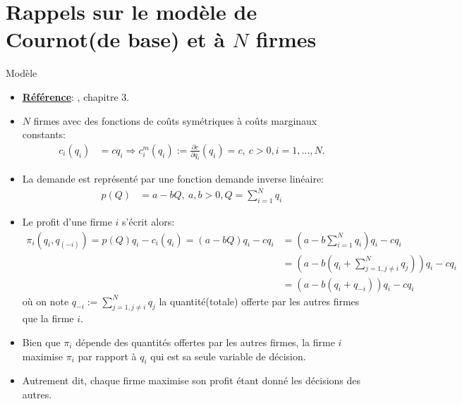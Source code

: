 \begin{frame}
\titlepage
\end{frame}
\begin{frame}
 \tableofcontents
    \end{frame}



\section{Rappels sur le modèle de Cournot(de base) et à $N$ firmes}
\frame{\sectionpage}
\begin{frame}[allowframebreaks]{Modèle}
\begin{itemize}
\item \textbf{\underline{Référence}}: \cite{belleflamme_peitz_2015}, chapitre 3.
\item $N$ firmes avec des fonctions de coûts symétriques à coûts marginaux constants:
\begin{align*}
    c_i(q_i) &=cq_i \Rightarrow c^m_i(q_i):= \frac{\partial c}{\partial q_i}(q_i) = c, \ c > 0, i=1, \ldots, N.
\end{align*}
\item La demande est représenté par une fonction demande inverse linéaire:
\begin{align*}
p(Q) &= a-bQ, \ a, b > 0, Q = \sum_{i=1}^N q_i
\end{align*}
\item Le profit d'une firme $i$ s'écrit alors: 
\begin{align*}
\pi_i(q_i, q_{(-i)}) = p(Q)q_i - c_i(q_i) =  (a-bQ)q_i - cq_i &= (a-b\sum_{i=1}^N q_i)q_i - cq_i\\
& = \left(a-b(q_i + \sum_{j=1, j\neq i}^N q_j)\right)q_i - cq_i\\
&= \left(a-b(q_i + q_{-i})\right)q_i - cq_i
\end{align*}
où on note $q_{-i}:= \sum_{j=1, j\neq i}^N q_j $ la quantité(totale) offerte par les autres firmes que la firme $i$.
\item Bien que $\pi_i$ dépende des quantités offertes par les autres firmes, 
la firme $i$ maximise $\pi_i$ par rapport à $q_i$ qui est sa seule variable de décision.
\item Autrement dit, chaque firme maximise son profit étant donné les décisions des autres.
\end{itemize}
\end{frame}

